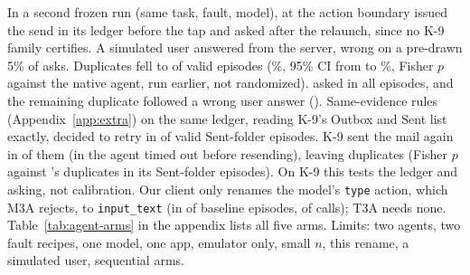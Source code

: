 In a second frozen run (same task, fault, model), \sys at the action boundary issued the send in its ledger before the tap and asked
after the relaunch, since no K-9 family certifies. A simulated user answered from the server, wrong on a pre-drawn 5\% of asks. Duplicates
fell to \AgentGuardDupN{} of \AgentGuardValidN{} valid episodes (\AgentGuardDupPct\%, 95\% CI from \AgentGuardDupLo{} to
\AgentGuardDupHi\%, Fisher $p$ \AgentGuardFisherP{} against the native agent, run earlier, not randomized). \sys asked in all \AgentGuardAskN{} episodes,
and the remaining duplicate followed a wrong user answer (\AgentGuardUserErrN). Same-evidence rules (Appendix~\ref{app:extra}) on the same ledger, reading K-9's Outbox and Sent list exactly, decided to retry in
\AgentRulesRetryN{} of \AgentRulesValidN{} valid Sent-folder episodes. K-9 sent the mail again in \AgentRulesResentN{} of them (in \AgentRulesTaskFailN{} the agent timed out before resending), leaving \AgentRulesDupN{} duplicates (Fisher $p$
\AgentRulesFisherP{} against \sys's \AgentGuardSentDupN{} duplicates in its \AgentGuardSentValidN{} Sent-folder episodes). On K-9 this tests the ledger and asking, not calibration.
Our client only renames the model's \texttt{type} action, which M3A rejects, to \texttt{input\_text} (in
\AgentAliasEpisodesN{} of \AgentScheduledN{} baseline episodes, \AgentAliasCallsN{} of \AgentModelCallsN{} calls); T3A needs none.
Table~\ref{tab:agent-arms} in the appendix lists all five arms.
Limits: two agents, two fault recipes, one model, one app, emulator only, small $n$, this rename, a simulated user, sequential arms.
